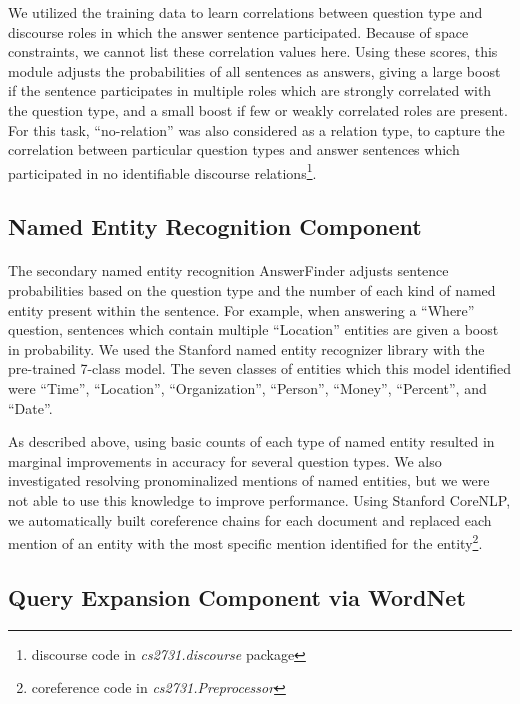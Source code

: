 \documentclass[11pt,letterpaper]{article}
\begin{document}
We utilized the training data to learn correlations between question type and discourse roles in which the answer sentence participated. Because of space constraints, we cannot list these correlation values here. Using these scores, this module adjusts the probabilities of all sentences as answers, giving a large boost if the sentence participates in multiple roles which are strongly correlated with the question type, and a small boost if few or weakly correlated roles are present. For this task, ``no-relation'' was also considered as a relation type, to capture the correlation between particular question types and answer sentences which participated in no identifiable discourse relations\footnote{discourse code in \textit{cs2731.discourse} package}.




\subsection{Named Entity Recognition Component}
\paragraph{}

The secondary named entity recognition AnswerFinder adjusts sentence probabilities based on the question type and the number of each kind of named entity present within the sentence. For example, when answering a ``Where'' question, sentences which contain multiple ``Location'' entities are given a boost in probability. We used the Stanford named entity recognizer library with the pre-trained 7-class model. The seven classes of entities which this model identified were ``Time'', ``Location'', ``Organization'', ``Person'', ``Money'', ``Percent'', and ``Date''. 

As described above, using basic counts of each type of named entity resulted in marginal improvements in accuracy for several question types. We also investigated resolving pronominalized mentions of named entities, but we were not able to use this knowledge to improve performance. Using Stanford CoreNLP, we automatically built coreference chains for each document and replaced each mention of an entity with the most specific mention identified for the entity\footnote{coreference code in \textit{cs2731.Preprocessor}}.


\subsection{Query Expansion Component via WordNet}
\end{document}
